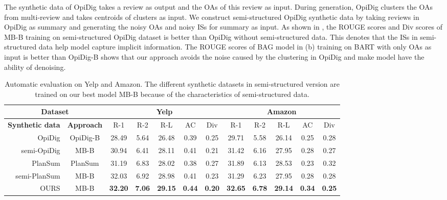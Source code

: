 The synthetic data of OpiDig takes
a review as output and the OAs of this review as input.
During generation, OpiDig clusters the OAs from multi-review and
takes centroids of clusters as input.
We construct semi-structured OpiDig synthetic data
by taking reviews in OpiDig as summary and 
generating the noisy OAs and noisy ISs for summary as input.
As shown in ,
the ROUGE scores and Div scores of MB-B training on semi-structured
OpiDig dataset is better than OpiDig without semi-structured data.  
This denotes that the ISs in semi-structured data help model
capture implicit information.
The ROUGE scores of
 BAG model in  (b) training on BART with only OAs as input is better than OpiDig-B
 shows that our approach avoids the noise caused by the clustering in OpiDig
 and make model have the ability of denoising.

\begin{table*}[th]
	\begin{center}
		\small
		\begin{tabular}{|r|c|c|c|c|c|c|c|c|c|c|c|}
			\hline
			\multicolumn{2}{|c|}{\bf Dataset} & \multicolumn{5}{c|}{\bf Yelp} &  \multicolumn{5}{c|}{\bf Amazon} \\
			\hline
			\textbf{Synthetic data} & \textbf{Approach} & R-1 & R-2 & R-L & AC & Div & R-1 & R-2 & R-L & AC & Div \\
			\hline
			OpiDig & OpiDig-B & 28.49 & 5.64 & 26.48 & 0.39 & 0.25 & 29.71 & 5.58 & 26.14 & 0.25 & 0.28\\ 
			semi-OpiDig& MB-B & 30.94 & 6.41 & 28.11 & 0.41 & 0.21 &31.42 & 6.16& 27.95 & 0.28 & 0.27\\
			\hline
			PlanSum & PlanSum & 31.19&6.83 &28.02 &0.38 & 0.27 & 31.89 &6.13 & 28.53 & 0.23 & 0.32\\  %
			semi-PlanSum& MB-B & 32.03& 6.92 & 28.98 & 0.41 & 0.23 & 31.29 & 6.23 &  27.95& 0.28 & 0.28 \\
			\hline
			OURS & MB-B & \bf 32.20 & \bf 7.06 & \bf 29.15 & \bf 0.44 & \bf 0.20 & \bf 32.65 & \bf 6.78 & \bf 29.14 & \bf 0.34 & \bf 0.25 \\ 
			\hline
		\end{tabular}
	\end{center}
	\caption{Automatic evaluation on Yelp and Amazon. The different synthetic datasets in semi-structured version
		are trained on our best model MB-B because of the characteristics of semi-structured data.}
	\label{tab:traindata}  
\end{table*}

